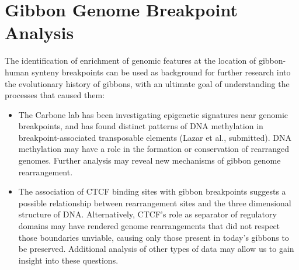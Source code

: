 \section{Gibbon Genome Breakpoint Analysis}

The identification of enrichment of genomic features at the location of gibbon-human synteny breakpoints can be used as background for further research into the evolutionary history of gibbons, with an ultimate goal of understanding the processes that caused them:

\begin{itemize}
\item The Carbone lab has been investigating epigenetic signatures near genomic breakpoints, and has found distinct patterns of DNA methylation in breakpoint-associated transposable elements (Lazar et al., submitted). DNA methylation may have a role in the formation or conservation of rearranged genomes. Further analysis may reveal new mechanisms of gibbon genome rearrangement.
\item The association of CTCF binding sites with gibbon breakpoints suggests a possible relationship between rearrangement sites and the three dimensional structure of DNA. Alternatively, CTCF's role as separator of regulatory domains may have rendered genome rearrangements that did not respect those boundaries unviable, causing only those present in today's gibbons to be preserved. Additional analysis of other types of data may allow us to gain insight into these questions.
\end{itemize}